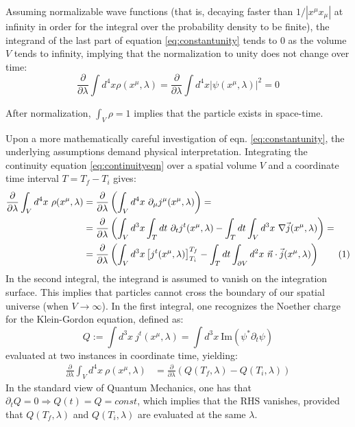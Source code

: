 \documentclass[twoside,a4paper,11pt]{article}
\newcommand\numberthis{\addtocounter{equation}{1}\tag{\theequation}} %
\numberwithin{equation}{section}
\begin{document}
Assuming normalizable wave functions (that is, decaying faster than $1/|x^\mu x_\mu|$ at infinity in order for the integral over the probability density to be finite), the integrand of the last part of equation \ref{eq:constantunity} tends to 0 as the volume $V$ tends to infinity, implying that the normalization to unity does not change over time:
\begin{equation}
    \frac{\partial}{\partial \lambda}  \int d^4 x \rho (x^\mu, \lambda)  =  \frac{\partial}{\partial \lambda} \int d^4 x |\psi (x^\mu, \lambda)|^2 = 0 
\end{equation}

After normalization, $\int_V \rho = 1$ implies that the particle exists in space-time.   

Upon a more mathematically careful investigation of eqn. \ref{eq:constantunity}, the underlying assumptions demand physical interpretation. Integrating the continuity equation \ref{eq:continuityeqn} over a spatial volume $V$ and a coordinate time interval $ T = T_f - T_i$ gives:
\begin{align*}
    \frac{\partial}{\partial \lambda} \int_V d^4 x\  \rho (x^\mu, \lambda) & = \frac{\partial}{\partial \lambda} \left(\int_V d^4 x \ \partial_\mu j^\mu (x^\mu, \lambda) \right) = \\
    & = \frac{\partial}{\partial \lambda} \left( \int_V d^3 x  \int_T dt  \ \partial_t j^t (x^\mu, \lambda) -  \int_T dt \int_V   d^3 x  \ \nabla \vec{j} (x^\mu, \lambda) \right) = \\
    & = \frac{\partial}{\partial \lambda} \left( \int_V d^3 x \left[j^t (x^\mu, \lambda)\right]_{T_i}^{T_f}  -  \int_T dt \int_{\partial V}   d^2 x  \  \vec{n} \cdot \vec{j}  (x^\mu, \lambda) \right) \numberthis
    \label{eq:explicitconstantunity} 
\end{align*}
In the second integral, the integrand is assumed to vanish on the integration surface. This implies that particles cannot cross the boundary of our spatial universe (when $V \to \infty$). In the first integral, one recognizes the Noether charge for the Klein-Gordon equation, defined as:
\begin{equation}
Q := \int d^3 x \ j^t(x^\mu, \lambda)  = \int d^3x \ \text{Im}( \psi^* \partial_t \psi )
\end{equation}
evaluated at two instances in coordinate time, yielding:
\begin{align}
    \frac{\partial}{\partial \lambda} \int_V d^4 x\  \rho (x^\mu, \lambda) &= \frac{\partial}{\partial \lambda} \left( Q(T_f, \lambda) - Q(T_i, \lambda)\right)
    \label{explicitconstantunity} 
\end{align}
In the standard view of Quantum Mechanics, one has that $\partial_t Q = 0 \Rightarrow Q(t) = Q = const$, which implies that the RHS vanishes, provided that $Q(T_f,\lambda)$ and $Q(T_i,\lambda)$ are evaluated at the same $\lambda$.
\end{document}
